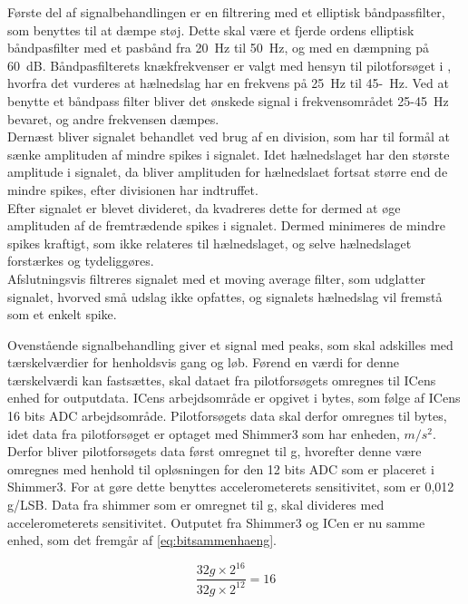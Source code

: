 Første del af signalbehandlingen er en filtrering med et elliptisk båndpassfilter, som benyttes til at dæmpe støj. Dette skal være et fjerde ordens elliptisk båndpasfilter med et pasbånd fra 20~Hz til 50~Hz, og med en dæmpning på 60~dB. Båndpasfilterets knækfrekvenser er valgt med hensyn til pilotforsøget i , hvorfra det vurderes at hælnedslag har en frekvens på 25~Hz til 45-~Hz. Ved at benytte et båndpass filter bliver det ønskede signal i frekvensområdet 25-45~Hz bevaret, og andre frekvensen dæmpes.\\
Dernæst bliver signalet behandlet ved brug af en division, som har til formål at sænke amplituden af mindre spikes i signalet. Idet hælnedslaget har den største amplitude i signalet, da bliver amplituden for hælnedslaet fortsat større end de mindre spikes, efter divisionen har indtruffet. \\
Efter signalet er blevet divideret, da kvadreres dette for dermed at øge amplituden af de fremtrædende spikes i signalet. Dermed minimeres de mindre spikes kraftigt, som ikke relateres til hælnedslaget, og selve hælnedslaget forstærkes og tydeliggøres. \\
Afslutningsvis filtreres signalet med et moving average filter, som udglatter signalet, hvorved små udslag ikke opfattes, og signalets hælnedslag vil fremstå som et enkelt spike.

Ovenstående signalbehandling giver et signal med peaks, som skal adskilles med tærskelværdier for henholdsvis gang og løb. Førend en værdi for denne tærskelværdi kan fastsættes, skal dataet fra pilotforsøgets omregnes til ICens enhed for outputdata. ICens arbejdsområde er opgivet i bytes, som følge af ICens 16 bits ADC arbejdsområde. Pilotforsøgets data skal derfor omregnes til bytes, idet data fra pilotforsøget er optaget med Shimmer3 som har enheden, $m/s^{2}$. Derfor bliver pilotforsøgets data først omregnet til g, hvorefter denne være omregnes med henhold til opløsningen for den 12 bits ADC som er placeret i Shimmer3. For at gøre dette benyttes accelerometerets sensitivitet, som er 0,012 g/LSB. Data fra shimmer som er omregnet til g, skal divideres med accelerometerets sensitivitet. Outputet fra Shimmer3 og ICen er nu samme enhed, som det fremgår af \eqref{eq:bitsammenhaeng}.
 
\begin{equation}
\frac{32 g \times 2^{16}}{32 g \times 2^{12}} = 16
\label{eq:bitsammenhaeng}
\end{equation}

